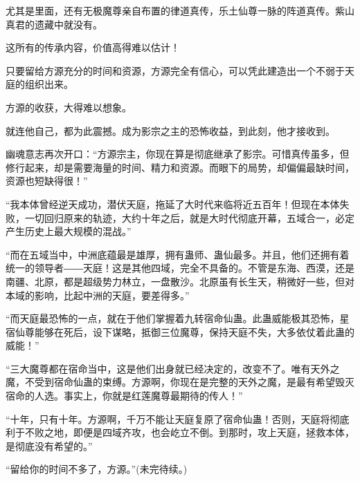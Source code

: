 \begin{this_body}
尤其是里面，还有无极魔尊亲自布置的律道真传，乐土仙尊一脉的阵道真传。紫山真君的遗藏中就没有。

这所有的传承内容，价值高得难以估计！

只要留给方源充分的时间和资源，方源完全有信心，可以凭此建造出一个不弱于天庭的组织出来。

方源的收获，大得难以想象。

就连他自己，都为此震撼。成为影宗之主的恐怖收益，到此刻，他才接收到。

幽魂意志再次开口：“方源宗主，你现在算是彻底继承了影宗。可惜真传虽多，但修行起来，却是需要海量的时间、精力和资源。而眼下的局势，却偏偏最缺时间，资源也短缺得很！”

“我本体曾经逆天成功，潜伏天庭，拖延了大时代来临将近五百年！但现在本体失败，一切回归原来的轨迹，大约十年之后，就是大时代彻底开幕，五域合一，必定产生历史上最大规模的混战。”

“而在五域当中，中洲底蕴最是雄厚，拥有蛊师、蛊仙最多。并且，他们还拥有着统一的领导者――天庭！这是其他四域，完全不具备的。不管是东海、西漠，还是南疆、北原，都是超级势力林立，一盘散沙。北原虽有长生天，稍微好一些，但对本域的影响，比起中洲的天庭，要差得多。”

“而天庭最恐怖的一点，就在于他们掌握着九转宿命仙蛊。此蛊威能极其恐怖，星宿仙尊能够在死后，设下谋略，抵御三位魔尊，保持天庭不失，大多依仗着此蛊的威能！”

“三大魔尊都在宿命当中，这是他们出身就已经决定的，改变不了。唯有天外之魔，不受到宿命仙蛊的束缚。方源啊，你现在是完整的天外之魔，是最有希望毁灭宿命的人选。事实上，你就是红莲魔尊最期待的传人！”

“十年，只有十年。方源啊，千万不能让天庭复原了宿命仙蛊！否则，天庭将彻底利于不败之地，即便是四域齐攻，也会屹立不倒。到那时，攻上天庭，拯救本体，是彻底没有希望的。”

“留给你的时间不多了，方源。”(未完待续。)

\end{this_body}

